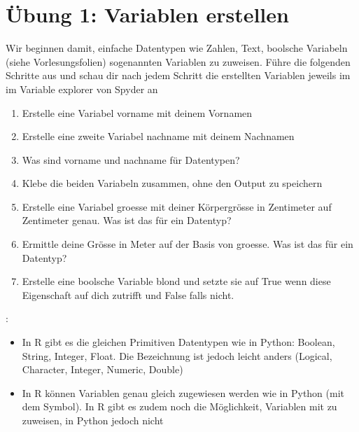 \documentclass[letterpaper,10pt,english]{sphinxmanual}
\begin{document}
\section{Übung 1: Variablen erstellen}
\label{\detokenize{01_02_Python_Basics:ubung-1-variablen-erstellen}}
Wir beginnen damit, einfache Datentypen wie Zahlen, Text, boolsche Variabeln (siehe Vorlesungsfolien) sogenannten Variablen zu zuweisen. Führe die folgenden Schritte aus und schau dir nach jedem Schritt die erstellten Variablen jeweils im im Variable explorer von Spyder an
\begin{enumerate}
%
\item {} 
Erstelle eine Variabel vorname mit deinem Vornamen

\item {} 
Erstelle eine zweite Variabel nachname mit deinem Nachnamen

\item {} 
Was sind vorname und nachname für Datentypen?

\item {} 
Klebe die beiden Variabeln zusammen, ohne den Output zu speichern

\item {} 
Erstelle eine Variabel groesse mit deiner Körpergrösse in Zentimeter auf Zentimeter genau. Was ist das für ein Datentyp?

\item {} 
Ermittle deine Grösse in Meter auf der Basis von groesse. Was ist das für ein Datentyp?

\item {} 
Erstelle eine boolsche Variable blond und setzte sie auf True wenn diese Eigenschaft auf dich zutrifft und False falls nicht.

\end{enumerate}

:
\begin{itemize}
\item {} 
In R gibt es die gleichen Primitiven Datentypen wie in Python: Boolean, String, Integer, Float. Die Bezeichnung ist jedoch leicht anders (Logical, Character, Integer, Numeric, Double)

\item {} 
In R können Variablen genau gleich zugewiesen werden wie in Python (mit dem \sphinxcode{\sphinxupquote{=}} Symbol). In R gibt es zudem noch die Möglichkeit, Variablen mit \sphinxcode{\sphinxupquote{\textless{}\sphinxhyphen{}}} zu zuweisen, in Python jedoch nicht

\end{itemize}
\end{document}
